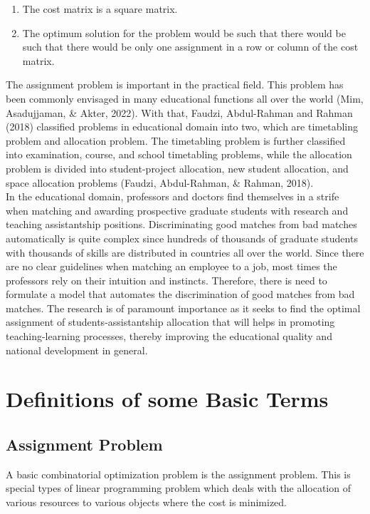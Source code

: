\documentclass[11pt]{report}
\newcommand{\NI}{\noindent}
\begin{document}
	\begin{enumerate}
		\item The cost matrix is a square matrix.
		\item The optimum solution for the problem would be such that there would be such that there would be only one assignment in a row or column of the cost matrix.
	\end{enumerate}
	
	\NI The assignment problem is important in the practical field. This problem has been commonly envisaged in many educational functions all over the world (Mim, Asadujjaman, \& Akter, 2022). With that, Faudzi, Abdul-Rahman and Rahman (2018) classified problems in educational domain into two, which are timetabling problem and allocation problem. The timetabling problem is further classified into examination, course, and school timetabling problems, while the allocation
	problem is divided into student-project allocation, new student allocation, and space allocation problems (Faudzi, Abdul-Rahman, \& Rahman, 2018).\\
	
	\NI In the educational domain, professors and doctors find themselves in a strife when matching and awarding prospective graduate students with research and teaching assistantship positions. Discriminating good matches from bad matches automatically is quite complex since hundreds of thousands of graduate students with thousands of skills are distributed in countries all over the world. Since there are no clear guidelines when matching an employee to a job, most times the
	professors rely on their intuition and instincts. Therefore, there is need to formulate a model that automates the discrimination of good matches from bad matches. The research is of paramount importance as it seeks to find the optimal assignment of students-assistantship allocation that will
	helps in promoting teaching-learning processes, thereby improving the educational quality and national development in general.
	
	\section{Definitions of some Basic Terms}
	\subsection{Assignment Problem}
	A basic combinatorial optimization problem is the assignment problem. This is special types of linear programming problem which deals with the allocation of various
	resources to various objects where the cost is minimized.
	
\end{document}
